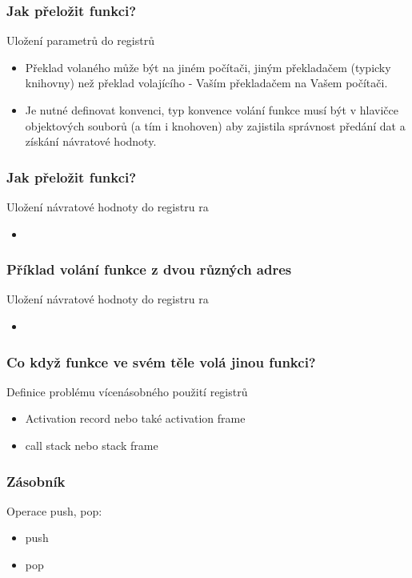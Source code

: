 \documentclass{beamer}
\begin{document}
\begin{frame}
\frametitle{Jak přeložit funkci?}

Uložení parametrů do registrů
\begin{itemize}
 \item Překlad volaného může být na jiném počítači, jiným překladačem (typicky knihovny) než překlad volajícího - Vaším překladačem na Vašem počítači.
 \item Je nutné definovat konvenci, typ konvence volání funkce musí být v hlavičce objektových souborů (a tím i knohoven) aby zajistila správnost předání dat a získání návratové hodnoty.
\end{itemize}
\end{frame}


\begin{frame}
\frametitle{Jak přeložit funkci?}

Uložení návratové hodnoty do registru ra
\begin{itemize}
 \item 
\end{itemize}
\end{frame}

\begin{frame}
\frametitle{Příklad volání funkce z dvou různých adres}

Uložení návratové hodnoty do registru ra
\begin{itemize}
 \item 
\end{itemize}
\end{frame}

\begin{frame}
\frametitle{Co když funkce ve svém těle volá jinou funkci?}

Definice problému vícenásobného použití registrů
\begin{itemize}
 \item Activation record nebo také activation frame 
 \item call stack nebo stack frame
\end{itemize}
\end{frame}


\begin{frame}
\frametitle{Zásobník}

Operace push, pop:
\begin{itemize}
 \item push 
 \item pop
\end{itemize}
\end{frame}
\end{document}
